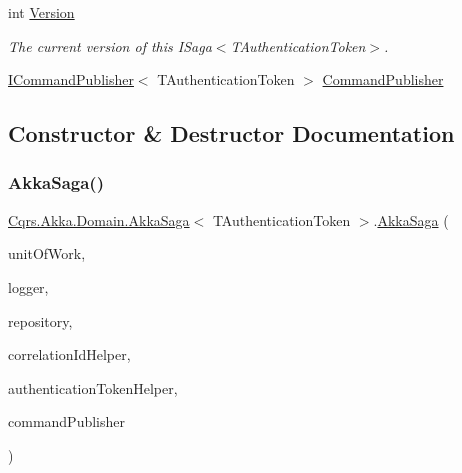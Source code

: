 \begin{DoxyCompactItemize}
int \hyperlink{classCqrs_1_1Akka_1_1Domain_1_1AkkaSaga_a3fda31a3857e12a1aed60f4a4f04edd1_a3fda31a3857e12a1aed60f4a4f04edd1}{Version}
\begin{DoxyCompactList}\small\item\em The current version of this I\+Saga$<$\+T\+Authentication\+Token$>$. \end{DoxyCompactList}\item 
\hyperlink{interfaceCqrs_1_1Commands_1_1ICommandPublisher}{I\+Command\+Publisher}$<$ T\+Authentication\+Token $>$ \hyperlink{classCqrs_1_1Akka_1_1Domain_1_1AkkaSaga_ac00968d1d69d89d46b43af10fc0d4510_ac00968d1d69d89d46b43af10fc0d4510}{Command\+Publisher}
\end{DoxyCompactItemize}


\subsection{Constructor \& Destructor Documentation}
\mbox{\label{classCqrs_1_1Akka_1_1Domain_1_1AkkaSaga_a2f0ebb5d1d22e3112d5b9a09fde7fb47_a2f0ebb5d1d22e3112d5b9a09fde7fb47}} 
\subsubsection{\texorpdfstring{Akka\+Saga()}{AkkaSaga()}}
{\footnotesize\ttfamily \hyperlink{classCqrs_1_1Akka_1_1Domain_1_1AkkaSaga}{Cqrs.\+Akka.\+Domain.\+Akka\+Saga}$<$ T\+Authentication\+Token $>$.\hyperlink{classCqrs_1_1Akka_1_1Domain_1_1AkkaSaga}{Akka\+Saga} (\begin{DoxyParamCaption}\item[{\hyperlink{interfaceCqrs_1_1Domain_1_1ISagaUnitOfWork}{I\+Saga\+Unit\+Of\+Work}$<$ T\+Authentication\+Token $>$}]{unit\+Of\+Work,  }\item[{I\+Logger}]{logger,  }\item[{\hyperlink{interfaceCqrs_1_1Akka_1_1Domain_1_1IAkkaSagaRepository}{I\+Akka\+Saga\+Repository}$<$ T\+Authentication\+Token $>$}]{repository,  }\item[{I\+Correlation\+Id\+Helper}]{correlation\+Id\+Helper,  }\item[{\hyperlink{interfaceCqrs_1_1Authentication_1_1IAuthenticationTokenHelper}{I\+Authentication\+Token\+Helper}$<$ T\+Authentication\+Token $>$}]{authentication\+Token\+Helper,  }\item[{\hyperlink{interfaceCqrs_1_1Commands_1_1ICommandPublisher}{I\+Command\+Publisher}$<$ T\+Authentication\+Token $>$}]{command\+Publisher }\end{DoxyParamCaption})\hspace{0.3cm}{\ttfamily [protected]}}



